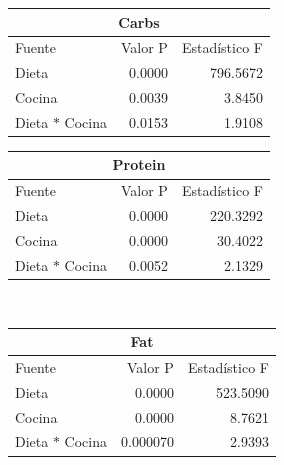 \documentclass[12pt,a4paper]{article}
\begin{document}
{{            \begin{center}
                \begin{tabular}{l|rr}
                \toprule
                    \multicolumn{3}{c}{Carbs} \\
                \midrule
                    Fuente & Valor P & Estadístico F \\
                \midrule
                    Dieta               & 0.0000 & 796.5672 \\
                    Cocina              & 0.0039 &   3.8450 \\
                    Dieta $\ast$ Cocina & 0.0153 &   1.9108 \\
                \bottomrule
                \end{tabular}
                \vspace*{0.5cm}
                \begin{tabular}{l|rr}
                    \toprule
                    \multicolumn{3}{c}{Protein} \\
                \midrule
                    Fuente & Valor P & Estadístico F \\
                \midrule
                    Dieta               & 0.0000 & 220.3292 \\
                    Cocina              & 0.0000 &  30.4022 \\
                    Dieta $\ast$ Cocina & 0.0052 &   2.1329 \\
                \bottomrule
                \end{tabular}\\
                \vspace*{0.1cm}
                \begin{tabular}{l|rr}
                    \toprule
                    \multicolumn{3}{c}{Fat} \\
                \midrule
                    Fuente & Valor P & Estadístico F \\
                \midrule
                    Dieta               & 0.0000   & 523.5090 \\
                    Cocina              & 0.0000   &   8.7621 \\
                    Dieta $\ast$ Cocina & 0.000070 &   2.9393 \\
                \bottomrule
                \end{tabular}
            \end{center}

}}
\end{document}
